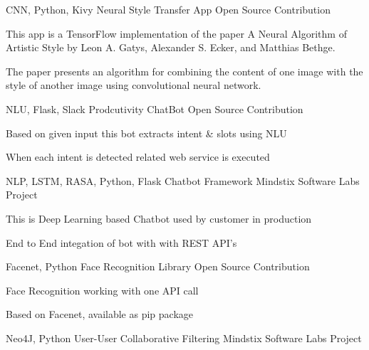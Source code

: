 \begin{cventries}
  \cventry
    {CNN, Python, Kivy} %
    {Neural Style Transfer App} %
    {Open Source Contribution} %
    {} %
    {
      \begin{cvitems} %
        \item {This app is a TensorFlow implementation of the paper A Neural Algorithm of Artistic Style by Leon A. Gatys, Alexander S. Ecker, and Matthias Bethge.}
        \item {The paper presents an algorithm for combining the content of one image with the style of another image using convolutional neural network.}
      \end{cvitems}
    }
  \cventry
    {NLU, Flask, Slack} %
    {Prodcutivity ChatBot} %
    {Open Source Contribution} %
    {} %
    {
      \begin{cvitems} %
        \item {Based on given input this bot extracts intent \& slots using NLU}
        \item {When each intent is detected related web service is executed}
      \end{cvitems}
    }
  \cventry
    {NLP, LSTM, RASA, Python, Flask} %
    {Chatbot Framework} %
    {Mindstix Software Labs Project} %
    {} %
    {
      \begin{cvitems} %
        \item {This is Deep Learning based Chatbot used by customer in production}
        \item {End to End integation of bot with with REST API's }
      \end{cvitems}
    }
  \cventry
    {Facenet, Python} %
    {Face Recognition Library} %
    {Open Source Contribution} %
    {} %
    {
      \begin{cvitems} %
        \item {Face Recognition working with one API call}
        \item {Based on Facenet, available as pip package}
      \end{cvitems}
    }
  \cventry
    {Neo4J, Python} %
    {User-User Collaborative Filtering} %
    {Mindstix Software Labs Project} %
    {} %

\end{cventries}
